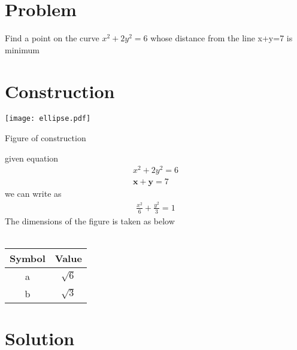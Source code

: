 \documentclass[10pt, a4paper]{article}
\title{\mytitle}
\author{\myauthor\hspace{1em}\\\contact\\FWC22066\hspace{6.5em}IITH\hspace{0.5em}\mymodule\hspace{6em}ASSIGN-6}
\date{}
\let\vec\mathbf
\begin{document}
	\maketitle
	\tableofcontents
   \section{Problem}
 Find a point on the curve $x^2+2y^2=6$ whose distance from the line x+y=7 is minimum 
\section{Construction}
  \texttt{[image: ellipse.pdf]}
  \begin{center}
  Figure of construction
  	\end{center}
given equation
\begin{align}
x^2+2y^2=6\\
\vec{x}+\vec{y}=7
\end{align}
we can write as\\
\begin{align}
\frac{x^2}{6}+\frac{y^2}{3}=1
\end{align}
  The dimensions of the figure is taken as below\\\\
{
\setlength\extrarowheight{2pt}
\centering
\begin{tabular}{|c|c|}
 \hline
 \textbf{Symbol}&\textbf{Value}\\
 \hline
 a&$\sqrt{6}$\\
 \hline
 b&$\sqrt{3}$\\
 \hline
\end{tabular}
}	
  \section{Solution}
\end{document}

